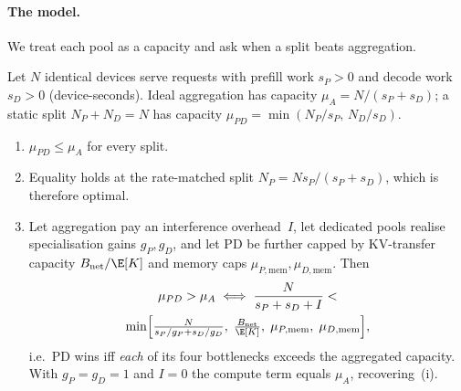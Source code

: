 \paragraph{The model.} We treat each pool as a capacity and ask when a
split beats aggregation.

\begin{proposition}\label{prop:pd}
Let $N$ identical devices serve requests with prefill work $s_P>0$ and
decode work $s_D>0$ (device-seconds). Ideal aggregation has capacity
$\mu_A=N/(s_P+s_D)$; a static split $N_P+N_D=N$ has capacity
$\mu_{PD}=\min(N_P/s_P,\,N_D/s_D)$.
\begin{enumerate}[nosep,leftmargin=1.6em,label=(\roman*)]
\item $\mu_{PD}\le\mu_A$ for every split.
\item Equality holds at the rate-matched split $N_P=Ns_P/(s_P+s_D)$,
      which is therefore optimal.
\item Let aggregation pay an interference overhead~$I$, let dedicated pools
      realise specialisation gains $g_P,g_D$, and let PD be further capped
      by KV-transfer capacity $B_{\mathrm{net}}/\E[K]$ and memory caps
      $\mu_{P,\mathrm{mem}},\mu_{D,\mathrm{mem}}$. Then
      \begin{multline*}
        \mu_{PD} > \mu_A \iff
        \frac{N}{s_P+s_D+I} < \\
        \min\Bigl[\tfrac{N}{s_P/g_P+s_D/g_D},\;
                  \tfrac{B_{\mathrm{net}}}{\E[K]},\;
                  \mu_{P,\mathrm{mem}},\;\mu_{D,\mathrm{mem}}\Bigr],
      \end{multline*}
      i.e.\ PD wins iff \emph{each} of its four bottlenecks exceeds the
      aggregated capacity. With $g_P=g_D=1$ and $I=0$ the compute term
      equals $\mu_A$, recovering~(i).
\end{enumerate}
\end{proposition}


